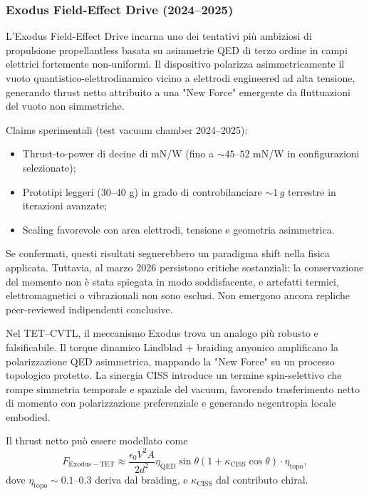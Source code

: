 \documentclass[11pt,a4paper]{article}
\theoremstyle{plain}
\theoremstyle{definition}
\begin{document}
\subsubsection{Exodus Field-Effect Drive (2024--2025)}

L'Exodus Field-Effect Drive incarna uno dei tentativi più ambiziosi di propulsione propellantless basata su asimmetrie QED di terzo ordine in campi elettrici fortemente non-uniformi. Il dispositivo polarizza asimmetricamente il vuoto quantistico-elettrodinamico vicino a elettrodi engineered ad alta tensione, generando thrust netto attribuito a una "New Force" emergente da fluttuazioni del vuoto non simmetriche.

Claims sperimentali (test vacuum chamber 2024–2025):
\begin{itemize}
    \item Thrust-to-power di decine di mN/W (fino a $\sim 45$--$52$ mN/W in configurazioni selezionate);
    \item Prototipi leggeri (30--40 g) in grado di controbilanciare $\sim 1\,g$ terrestre in iterazioni avanzate;
    \item Scaling favorevole con area elettrodi, tensione e geometria asimmetrica.
\end{itemize}

Se confermati, questi risultati segnerebbero un paradigma shift nella fisica applicata. Tuttavia, al marzo 2026 persistono critiche sostanziali: la conservazione del momento non è stata spiegata in modo soddisfacente, e artefatti termici, elettromagnetici o vibrazionali non sono esclusi. Non emergono ancora repliche peer-reviewed indipendenti conclusive.

Nel TET–CVTL, il meccanismo Exodus trova un analogo più robusto e falsificabile. Il torque dinamico Lindblad + braiding anyonico amplificano la polarizzazione QED asimmetrica, mappando la "New Force" su un processo topologico protetto. La sinergia CISS introduce un termine spin-selettivo che rompe simmetria temporale e spaziale del vacuum, favorendo trasferimento netto di momento con polarizzazione preferenziale e generando negentropia locale embodied.

Il thrust netto può essere modellato come
\begin{equation}
F_{\mathrm{Exodus-TET}} \approx \frac{\epsilon_0 V^2 A}{2 d^2} \eta_{\mathrm{QED}} \sin\theta \left( 1 + \kappa_{\mathrm{CISS}} \cos\theta \right) \cdot \eta_{\mathrm{topo}},
\label{eq:exodus-tet-thrust}
\end{equation}
dove $\eta_{\mathrm{topo}} \sim 0.1$--$0.3$ deriva dal braiding, e $\kappa_{\mathrm{CISS}}$ dal contributo chiral.
\end{document}
